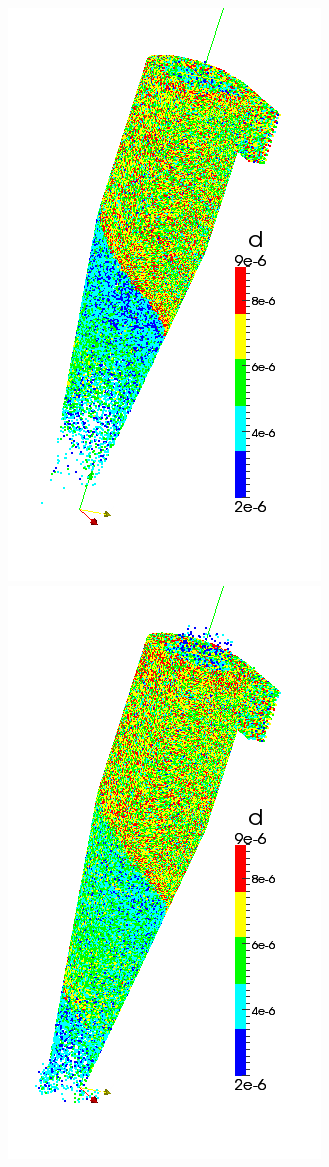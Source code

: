 \begin{figure}[h]
\begin{minipage}{0.2\linewidth}
		\includegraphics[scale=0.3]{t2}
	\end{minipage}
		\hspace{-1em}
	\begin{minipage}{0.2\linewidth}
		\includegraphics[scale=0.3]{t3}

\end{minipage}
\end{figure}
